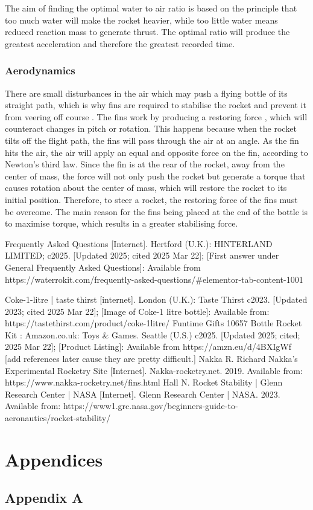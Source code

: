 \documentclass[14pt]{article}
\begin{document}
The aim of finding the optimal water to air ratio is based on the principle that too much water will make the rocket heavier, while too little water means reduced reaction mass to generate thrust. The optimal ratio will produce the greatest acceleration and therefore the greatest recorded time. 
\subsubsection{Aerodynamics}
There are small disturbances in the air which may push a flying bottle of its straight path, which is why fins are required to stabilise the rocket and prevent it from veering off course \cite{4}. The fins work by producing a restoring force \cite{5}, which will counteract changes in pitch or rotation. This happens because when the rocket tilts off the flight path, the fins will pass through the air at an angle. As the fin hits the air, the air will apply
an equal and opposite force on the fin, according to Newton's third law. Since the fin is at the rear of the rocket, away from the center of mass,
the force will not only push the rocket but generate a torque that causes rotation about the center of mass, which will restore the rocket to its initial position.  Therefore,
to steer a rocket, the restoring force of the fins must be overcome.
The main reason for the fins being placed at the end of the bottle is to maximise torque, which results in a greater stabilising force.
\begin{thebibliography}{0}
Frequently Asked Questions [Internet]. Hertford (U.K.): HINTERLAND LIMITED; c2025. [Updated 2025; cited 2025 Mar 22]; [First answer under General Frequently Asked Questions]: Available from https://waterrokit.com/frequently-asked-questions/\#elementor-tab-content-1001

Coke-1-litre | taste thirst [internet]. London (U.K.): Taste Thirst c2023. [Updated 2023; cited 2025 Mar 22]; [Image of Coke-1 litre bottle]: Available from: https://tastethirst.com/product/coke-1litre/
Funtime Gifts 10657 Bottle Rocket Kit : Amazon.co.uk: Toys \& Games. Seattle (U.S.) c2025. [Updated 2025; cited; 2025 Mar 22]; [Product Listing]: Available from https://amzn.eu/d/4BXIgWf
[add references later cause they are pretty difficult.]
Nakka R. Richard Nakka's Experimental Rocketry Site [Internet]. Nakka-rocketry.net. 2019. Available from: https://www.nakka-rocketry.net/fins.html
Hall N. Rocket Stability | Glenn Research Center | NASA [Internet]. Glenn Research Center | NASA. 2023. Available from: https://www1.grc.nasa.gov/beginners-guide-to-aeronautics/rocket-stability/
\end{thebibliography}

\section{Appendices}
\subsection{Appendix A}
\label {Appendix A}
\end{document}
